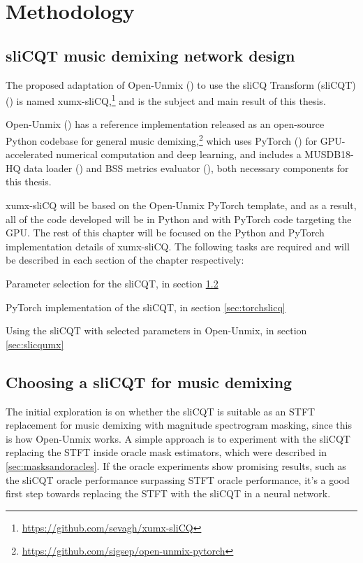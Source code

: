 \documentclass[report.tex]{subfiles}
\begin{document}
\section{Methodology}

\subsection{sliCQT music demixing network design}

The proposed adaptation of Open-Unmix (\cite{umx}) to use the sliCQ Transform (sliCQT) (\cite{invertiblecqt, slicq}) is named xumx-sliCQ,\footnote{\url{https://github.com/sevagh/xumx-sliCQ}} and is the subject and main result of this thesis.

Open-Unmix (\cite{umx}) has a reference implementation released as an open-source Python codebase for general music demixing,\footnote{\url{https://github.com/sigsep/open-unmix-pytorch}} which uses PyTorch (\cite{pytorch}) for GPU-accelerated numerical computation and deep learning, and includes a MUSDB18-HQ data loader (\cite{musdb18hq}) and BSS metrics evaluator (\cite{bss}), both necessary components for this thesis.

xumx-sliCQ will be based on the Open-Unmix PyTorch template, and as a result, all of the code developed will be in Python and with PyTorch code targeting the GPU. The rest of this chapter will be focused on the Python and PyTorch implementation details of xumx-sliCQ. The following tasks are required and will be described in each section of the chapter respectively:
\begin{tight_enumerate}
	\item
		Parameter selection for the sliCQT, in section \ref{sec:slicqparamsrch}
	\item
		PyTorch implementation of the sliCQT, in section \ref{sec:torchslicq}
	\item
		Using the sliCQT with selected parameters in Open-Unmix, in section \ref{sec:slicqumx}
\end{tight_enumerate}

\subsection{Choosing a sliCQT for music demixing}
\label{sec:slicqparamsrch}

The initial exploration is on whether the sliCQT is suitable as an STFT replacement for music demixing with magnitude spectrogram masking, since this is how Open-Unmix works. A simple approach is to experiment with the sliCQT replacing the STFT inside oracle mask estimators, which were described in \ref{sec:masksandoracles}. If the oracle experiments show promising results, such as the sliCQT oracle performance surpassing STFT oracle performance, it's a good first step towards replacing the STFT with the sliCQT in a neural network.
\end{document}
